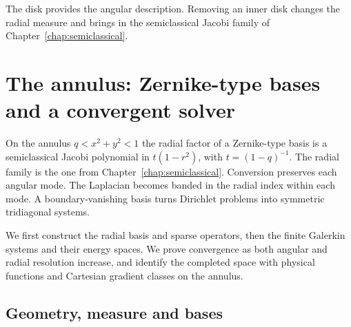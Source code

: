 \begin{supporting}
\end{supporting}

The disk provides the angular description. Removing an inner disk changes
the radial measure and brings in the semiclassical Jacobi family of
Chapter~\ref{chap:semiclassical}.

\chapter{The annulus: Zernike-type bases and a convergent solver}\label{chap:annulus}

On the annulus $q<x^2+y^2<1$ the radial factor of a Zernike-type basis is a
semiclassical Jacobi polynomial in $t(1-r^2)$, with $t=(1-q)^{-1}$. The radial family is the one from
Chapter~\ref{chap:semiclassical}. Conversion preserves each angular
mode. The Laplacian becomes banded in the radial index within each mode. A
boundary-vanishing basis turns Dirichlet problems into symmetric tridiagonal
systems.

We first construct the radial basis and sparse operators, then the finite
Galerkin systems and their energy spaces. We prove convergence as both angular
and radial resolution increase, and identify the completed space with physical
functions and Cartesian gradient classes on the annulus.

\section{Geometry, measure and bases}\label{sec:annular-geometry}

